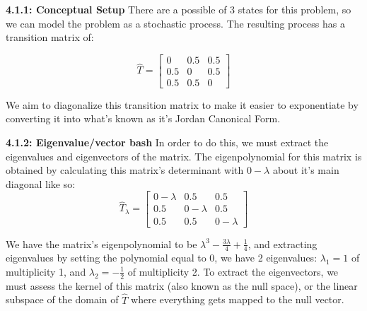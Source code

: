 \begin{enumerate}
 \textbf{4.1.1: Conceptual Setup} There are a possible of 3 states for this problem, so we can model the problem as a stochastic process. The resulting process has a transition matrix of:

 
 \[\hat{T} = \begin{bmatrix} 0 & 0.5 & 0.5\\ 0.5 & 0 & 0.5\\ 0.5 & 0.5 & 0 \end{bmatrix}\]

 We aim to diagonalize this transition matrix to make it easier to exponentiate by converting it into what's known as it's Jordan Canonical Form. 

 \textbf{4.1.2: Eigenvalue/vector bash} In order to do this, we must extract the eigenvalues and eigenvectors of the matrix. The eigenpolynomial for this matrix is obtained by calculating this matrix's determinant with $0-\lambda$ about it's main diagonal like so:
 \[\hat{T}_{\lambda} = \begin{bmatrix} 0-\lambda & 0.5 & 0.5\\ 0.5 & 0-\lambda & 0.5\\ 0.5 & 0.5 & 0-\lambda \end{bmatrix}\]

 We have the matrix's eigenpolynomial to be $\lambda^3 - \frac{3\lambda}{4} + \frac{1}{4}$, and extracting eigenvalues by setting the polynomial equal to $0$, we have 2 eigenvalues: $\lambda_1 = 1$ of multiplicity 1, and $\lambda_2 = -\frac{1}{2}$ of multiplicity 2. To extract the eigenvectors, we must assess the kernel of this matrix (also known as the null space), or the linear subspace of the domain of $\hat{T}$ where everything gets mapped to the null vector. 


\end{enumerate}
